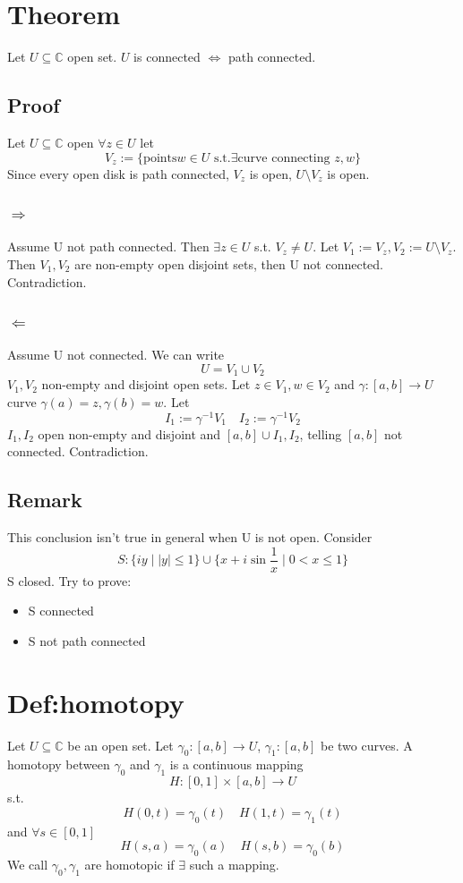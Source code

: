 \documentclass{book}
\newcommand{\abs}[1]{\left\lvert #1 \right\rvert}
\begin{document}
\section{Theorem}Let $U\subseteq \mathbb C$ open set. $U$ is connected $\Leftrightarrow$ path connected.
\subsection*{Proof}
Let $U\subseteq \mathbb C$ open $\forall z\in U$ let $$V_z:=\{\text{points} w\in U\text{ s.t.}\exists\text{curve connecting }z,w\}$$
Since every open disk is path connected, $V_z$ is open, $U\setminus V_z$ is open.
\subsubsection{$\Rightarrow$}
Assume U not path connected. Then $\exists z\in U$ s.t. $V_z\neq U$. Let $V_1:=V_z, V_2:=U\setminus V_z$. Then $V_1,V_2$ are non-empty open disjoint sets, then U not connected. Contradiction.
\subsubsection{$\Leftarrow$}
Assume U not connected. We can write $$U=V_1\cup V_2$$$V_1,V_2$ non-empty and disjoint open sets. Let $z\in V_1,w\in V_2$ and $\gamma:[a,b]\rightarrow U$ curve $\gamma(a)=z,\gamma(b)=w$. Let $$I_1:=\gamma^{-1}V_1\quad I_2:=\gamma^{-1}V_2$$ $I_1,I_2$ open non-empty and disjoint and $[a,b]\cup I_1,I_2$, telling $[a,b]$ not connected. Contradiction.


\subsection{Remark}This conclusion isn't true in general when U is not open. Consider $$S:\{i y\mid\abs y\leq 1\}\cup\{x+i\sin\frac{1}x\mid 0<x\leq 1\}$$
S closed. Try to prove:\begin{itemize}
    \item S connected
    \item S not path connected
\end{itemize}
\section{Def:homotopy}
Let $U\subseteq \mathbb C$ be an open set. Let $\gamma_0:[a,b]\rightarrow U$, $\gamma_1:[a,b]$ be two curves. A homotopy between $\gamma_0$ and $\gamma_1$ is a continuous mapping $$H:[0,1]\times[a,b]\rightarrow U$$ s.t. $$H(0,t)=\gamma_0(t)\quad H(1,t)=\gamma_1(t)$$
and $\forall s\in [0,1]$
$$H(s,a)=\gamma_0(a)\quad H(s,b)=\gamma_0(b)$$
We call $\gamma_0,\gamma_1$ are homotopic if $\exists$ such a mapping.
\end{document}
